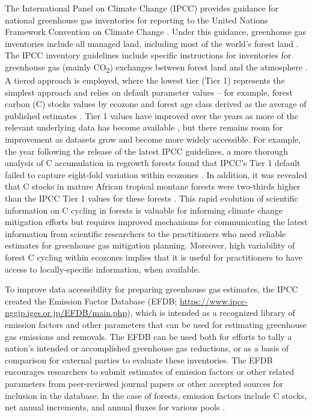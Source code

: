 \documentclass[, manuscript]{copernicus}
\begin{document}
The International Panel on Climate Change (IPCC) provides guidance for
national greenhouse gas inventories for reporting to the United Nations
Framework Convention on Climate Change
\citep[UNFCCC,][]{ipcc_2006_2006, ipcc_2019_2019}. Under this guidance,
greenhouse gas inventories include all managed land, including most of
the world's forest land \citep{ogle_delineating_2018}. The IPCC
inventory guidelines include specific instructions for inventories for
greenhouse gas (mainly CO\textsubscript{2}) exchanges between forest
land and the atmosphere \citep{ipcc_agriculture_2006, ipcc_2019_2019}. A
tiered approach is employed, where the lowest tier (Tier 1) represents
the simplest approach and relies on default parameter values -- for
example, forest carbon (C) stocks values by ecozone
\citep{fao_global_2012} and forest age class derived as the average of
published estimates \citep{ipcc_2019_2019, rozendaal_aboveground_2022}.
Tier 1 values have improved over the years as more of the relevant
underlying data has become available
\citep{requenasuarez_estimating_2019, rozendaal_aboveground_2022}, but
there remains room for improvement as datasets grow and become more
widely accessible. For example, the year following the release of the
latest IPCC guidelines, a more thorough analysis of C accumulation in
regrowth forests found that IPCC's Tier 1 default failed to capture
eight-fold variation within ecozones \citep{cook-patton_mapping_2020}.
In addition, it was revealed that C stocks in mature African tropical
montane forests were two-thirds higher than the IPCC Tier 1 values for
these forests \citep{cuni-sanchez_high_2021}. This rapid evolution of
scientific information on C cycling in forests is valuable for informing
climate change mitigation efforts but requires improved mechanisms for
communicating the latest information from scientific researchers to the
practitioners who need reliable estimates for greenhouse gas mitigation
planning. Moreover, high variability of forest C cycling within ecozones
\citep[e.g.,][]{cook-patton_mapping_2020, cuni-sanchez_high_2021}
implies that it is useful for practitioners to have access to
locally-specific information, when available.

To improve data accessibility for preparing greenhouse gas estimates,
the IPCC created the Emission Factor Database (EFDB;
\url{https://www.ipcc-nggip.iges.or.jp/EFDB/main.php}), which is
intended as a recognized library of emission factors and other
parameters that can be used for estimating greenhouse gas emissions and
removals. The EFDB can be used both for efforts to tally a nation's
intended or accomplished greenhouse gas reductions, or as a basis of
comparison for external parties to evaluate these inventories. The EFDB
encourages researchers to submit estimates of emission factors or other
related parameters from peer-reviewed journal papers or other accepted
sources for inclusion in the database. In the case of forests, emission
factors include C stocks, net annual increments, and annual fluxes for
various pools \citep{ipcc_2006_2006, ipcc_2019_2019}.
\end{document}
